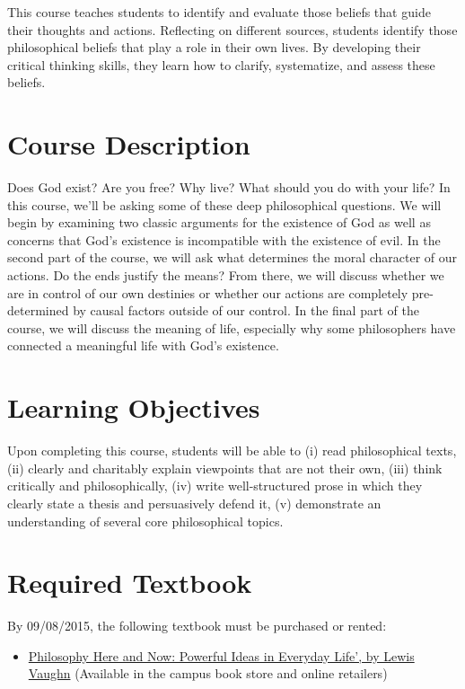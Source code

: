 \documentclass[11pt,article,oneside]{memoir}
\begin{document}
This course teaches students to identify and evaluate those beliefs that guide their thoughts and actions. Reflecting on different sources, students identify those philosophical beliefs that play a role in their own lives. By developing their critical thinking skills, they learn how to clarify, systematize, and assess these beliefs. 

\section{Course Description}

Does God exist? Are you free? Why live? What should you do with your life?  In this
course, we'll be asking some of these deep philosophical questions. We
will begin by examining two classic arguments for the existence of God
as well as concerns that God's existence is incompatible with the
existence of evil. In the second part of the course, we will ask what determines the moral character of our actions. Do the ends justify the means? From there, we will discuss whether we are in control of our own destinies or whether our actions are completely pre-determined by causal factors outside of our control. In the final part of the course, we will discuss the meaning of life, especially why some philosophers have connected a meaningful life with God's existence.

\section{Learning Objectives}

Upon completing this course, students will be able to (i) read
philosophical texts, (ii) clearly and charitably explain viewpoints that
are not their own, (iii) think critically and philosophically, (iv)
write well-structured prose in which they clearly state a thesis and
persuasively defend it, (v) demonstrate an understanding of several core
philosophical topics.

\section{Required Textbook}

By 09/08/2015, the following textbook must be purchased or rented:

\begin{itemize}
\item
  \href{http://www.amazon.com/Philosophy-Here-Now-Powerful-Everyday/dp/0199765227}{Philosophy
  Here and Now: Powerful Ideas in Everyday Life', by Lewis Vaughn}
  (Available in the campus book store and online retailers)
\end{itemize}
\end{document}
